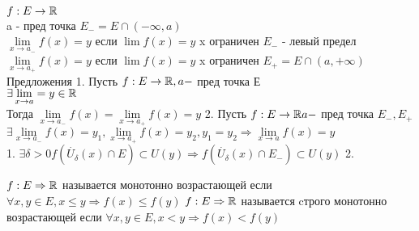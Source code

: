 $ f : E \rightarrow \mathbb{R} $ \\
a - пред точка $E_- = E \cap (-\infty, a) $\\
$  \lim\limits_{x \rightarrow a_-} f(x) = y $ если $ \lim f(x) = y $ x ограничен $ E_- $ - левый предел \\
$  \lim\limits_{x \rightarrow a_+} f(x) = y $ если $ \lim f(x) = y $ x ограничен $ E_+ = E \cap (a, +\infty)$  \\
Предложения
1. Пусть $ f:E\rightarrow \mathbb{R} ,a - $ пред точка Е \\
$ \exists \lim\limits_{x \rightarrow a} = y \in \mathbb{R} $ \\
Тогда $  \lim\limits_{x \rightarrow a_-} f(x)  =  \lim\limits_{x \rightarrow a_+} f(x)= y$
2. Пусть $ f : E \rightarrow \mathbb{R} a - $ пред точка $ E_-, E_+ $\\
$ \exists  \lim\limits_{x \rightarrow a_-} f(x) = y_1,  \lim\limits_{x \rightarrow a_+} f(x) = y_2, y_1 = y_2 \Rightarrow  \lim\limits_{x \rightarrow a} f(x) = y $ \\
1. $ \exists \delta > 0 f(\dot{U_{\delta}}(x) \cap E ) \subset U(y)  \Rightarrow  f(\dot{U_{\delta}}(x) \cap E_- ) \subset U(y)   $
2. %

\begin{definition}
	 $ f : E \Rightarrow \mathbb{R} $ называется монотонно возрастающей если $ \forall x, y \in E, x \leq y \Rightarrow f(x) \leq f(y)$
	 $ f : E \Rightarrow \mathbb{R} $ называется cтрого монотонно возрастающей если $ \forall x, y \in E, x < y \Rightarrow f(x) < f(y)$
\end{definition}

